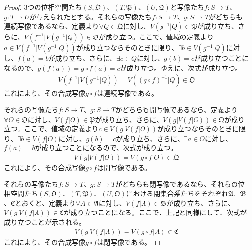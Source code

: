 \documentclass[dvipdfmx]{jsarticle}
\begin{document}
\begin{proof}
3つの位相空間たち$\left( S,\mathfrak{O} \right)$、$\left( T,\mathfrak{P} \right)$、$\left( U,\mathfrak{Q} \right)$と写像たち$f:S \rightarrow T$、$g:T \rightarrow U$が与えられたとする。それらの写像たち$f:S \rightarrow T$、$g:S \rightarrow T$がどちらも連続写像であるなら、定義より$\forall Q \in \mathfrak{Q}$に対し、$V\left( g^{- 1}|Q \right)\in \mathfrak{P}$が成り立ち、さらに、$V\left( f^{- 1}|V\left( g^{- 1}|Q \right) \right) \in \mathfrak{O}$が成り立つ。ここで、値域の定義より$a \in V\left( f^{- 1}|V\left( g^{- 1}|Q \right) \right)$が成り立つならそのときに限り、$\exists b \in V\left( g^{- 1}|Q \right)$に対し、$f(a) = b$が成り立ち、さらに、$\exists c \in Q$に対し、$g(b) = c$が成り立つことになるので、$g\left( f(a) \right) = g \circ f(a) = c$が成り立つ。ゆえに、次式が成り立つ。
\begin{align*}
V\left( f^{- 1}|V\left( g^{- 1}|Q \right) \right) = V\left( (g \circ f)^{- 1}|Q \right) \in \mathfrak{O}
\end{align*}
これにより、その合成写像$g \circ f$は連続写像である。\par
それらの写像たち$f:S \rightarrow T$、$g:S \rightarrow T$がどちらも開写像であるなら、定義より$\forall O \in \mathfrak{O}$に対し、$V\left( f|O \right) \in \mathfrak{P}$が成り立ち、さらに、$V\left( g|V\left( f|O \right) \right) \in \mathfrak{Q}$が成り立つ。ここで、値域の定義より$c \in V\left( g|V\left( f|O \right) \right)$が成り立つならそのときに限り、$\exists b \in V\left( f|O \right)$に対し、$g(b) = c$が成り立ち、さらに、$\exists a \in O$に対し、$f(a) = b$が成り立つことになるので、次式が成り立つ。
\begin{align*}
V\left( g|V\left( f|O \right) \right) = V\left( g \circ f|O \right) \in \mathfrak{Q}
\end{align*}
これにより、その合成写像$g \circ f$は開写像である。\par
それらの写像たち$f:S \rightarrow T$、$g:S \rightarrow T$がどちらも閉写像であるなら、それらの位相空間たち$\left( S,\mathfrak{O} \right)$、$\left( T,\mathfrak{P} \right)$、$\left( U,\mathfrak{Q} \right)$における閉集合系たちをそれぞれ$\mathfrak{A}$、$\mathfrak{B}$、$\mathfrak{C}$とおくと、定義より$\forall A \in \mathfrak{A}$に対し、$V\left( f|A \right) \in \mathfrak{B}$が成り立ち、さらに、$V\left( g|V\left( f|A \right) \right) \in \mathfrak{C}$が成り立つことになる。ここで、上記と同様にして、次式が成り立つことが示される。
\begin{align*}
V\left( g|V\left( f|A \right) \right) = V\left( g \circ f|A \right) \in \mathfrak{C}
\end{align*}
これにより、その合成写像$g \circ f$は閉写像である。
\end{proof}
\end{document}
